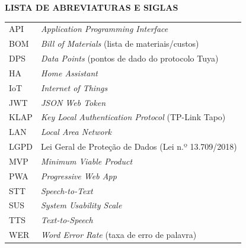 \begin{center}\textbf{LISTA DE ABREVIATURAS E SIGLAS}\end{center}
\vspace{0.4cm}

\begingroup
\singlespacing
\setlength{\parindent}{0pt}
\begin{longtable}{@{}p{3.2cm}p{\dimexpr\linewidth-3.4cm}@{}}
API   & \textit{Application Programming Interface} \\
BOM   & \textit{Bill of Materials} (lista de materiais/custos) \\
DPS   & \textit{Data Points} (pontos de dado do protocolo Tuya) \\
HA    & \textit{Home Assistant} \\
IoT   & \textit{Internet of Things} \\
JWT   & \textit{JSON Web Token} \\
KLAP  & \textit{Key Local Authentication Protocol} (TP-Link Tapo) \\
LAN   & \textit{Local Area Network} \\
LGPD  & Lei Geral de Proteção de Dados (Lei n.º 13.709/2018) \\
MVP   & \textit{Minimum Viable Product} \\
PWA   & \textit{Progressive Web App} \\
STT   & \textit{Speech-to-Text} \\
SUS   & \textit{System Usability Scale} \\
TTS   & \textit{Text-to-Speech} \\
WER   & \textit{Word Error Rate} (taxa de erro de palavra) \\
\end{longtable}
\endgroup
\newpage
